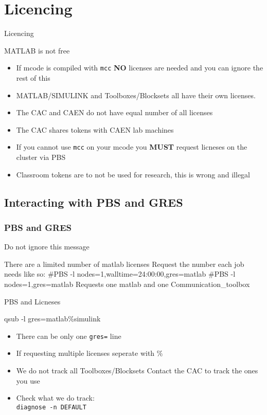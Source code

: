 \documentclass[handout]{beamer}
\begin{document}
  \section{Licencing}
  \begin{frame}{Licencing}
   \begin{block}{MATLAB is not free}
    \begin{itemize}
     \item If mcode is compiled with \texttt{mcc} {\bf NO} licenses are needed and you can ignore the rest of this
     \item MATLAB/SIMULINK and Toolboxes/Blocksets all have their own licenses.
     \item The CAC and CAEN do not have equal number of all licenses
     \item The CAC shares tokens with CAEN lab machines
     \item If you cannot use \texttt{mcc} on your mcode you {\bf MUST} request licneses on the cluster via PBS
     \item Classroom tokens are to not be used for research, this is wrong and illegal
    \end{itemize}
   \end{block}
  \end{frame}

   \subsection{Interacting with PBS and GRES}
\begin{frame}[fragile]
\frametitle{PBS and GRES}
    \begin{block}{Do not ignore this message}
     \begin{semiverbatim}
There are a limited number of matlab licenses
Request the number each job needs like so:
	 #PBS -l nodes=1,walltime=24:00:00,gres=matlab
	 #PBS -l nodes=1,gres=matlab%
Requests one matlab and one Communication_toolbox
     \end{semiverbatim}
    \end{block}
\end{frame}
\begin{frame}{PBS and Licneses}
    \begin{block}{qsub -l gres=matlab\%simulink}
     \begin{itemize}
      \item There can be only one \texttt{gres=} line
      \item If requesting multiple licenses seperate with \%
      \item We do not track all Toolboxes/Blocksets Contact the CAC to track the ones you use
      \item Check what we do track: \\
\texttt{diagnose -n DEFAULT}
     \end{itemize}
    \end{block}
\end{frame}
\end{document}
